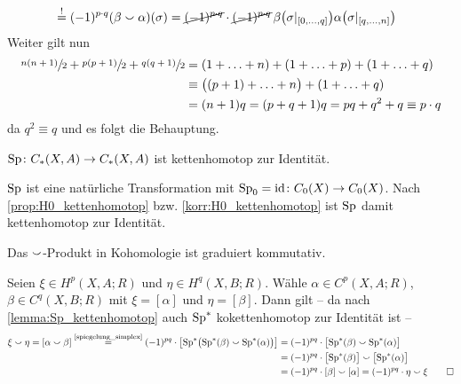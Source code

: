 \begin{beweis}
\begin{enumerate}[a)]
\begin{align}
			&\stackrel{!}{=} (-1)^{p \cdot q} \enbrace*{\beta \cupp \alpha}(\sigma) = \cancel{(-1)^{p \cdot q}} \cdot \cancel{(-1)^{p \cdot q}} \,\beta \enbrace*{\sigma|_{\benbrace{0, \ldots ,q}}} 
			\alpha \enbrace*{\sigma|_{\benbrace*{q, \ldots ,n}}}
		\end{align}
		Weiter gilt nun
		\begin{align}
			\sfrac{n(n+1)}{2} + \sfrac{p(p+1)}{2} + \sfrac{q(q+1)}{2} &= (1+ \ldots + n) + (1+ \ldots + p) + (1+ \ldots + q)\\ 
			&\equiv \enbrace[\big]{(p+1) + \ldots + n} + (1+ \ldots + q)\\
			&= (n+1) q = (p+q+1) q = pq + q^2 + q \equiv p \cdot q
		\end{align}
		da $q^2 \equiv q$ und es folgt die Behauptung.\qedhere
	\end{enumerate}
\end{beweis}

\begin{lemma}[{name=[Spiegelung ist kettenhomotop zur Identität]},label=lemma:Sp_kettenhomotop]
	$\Sp \colon C_*(X,A) \to C_*(X,A)$ ist kettenhomotop zur Identität. 
\end{lemma}
\begin{beweis}
	$\Sp$ ist eine natürliche Transformation mit $\Sp_0 =\id \colon C_0(X) \to C_0(X)$.
	Nach \autoref{prop:H0_kettenhomotop} bzw. \autoref{korr:H0_kettenhomotop} ist $\Sp$ damit kettenhomotop zur Identität.
\end{beweis}

\begin{satz}[{name=[Das $\cupp$-Produkt in Kohomologie ist graduiert kommutativ]}]
	Das $\cupp$-Produkt in Kohomologie ist graduiert kommutativ. 
\end{satz}
\begin{beweis}
	Seien $\xi \in H^p(X,A;R)$ und $\eta \in H^q(X,B;R)$. 
	Wähle $\alpha \in C^p(X,A;R)$, $\beta \in C^q(X,B;R)$ mit $\xi= [\alpha]$ und $\eta= [\beta]$. 
	Dann gilt -- da nach \autoref{lemma:Sp_kettenhomotop} auch $\Sp^*$ kokettenhomotop zur Identität ist --
	\begin{align}
		\xi \cupp \eta = \benbrace*{\alpha \cupp \beta} \StackText{\ref{spiegelung_simplex}}{=} (-1)^{pq} \cdot \benbrace*{\Sp^* \enbrace[\big]{\Sp^*(\beta) \cupp \Sp^*(\alpha)}} &= (-1)^{pq} \cdot 
		\benbrace[\big]{\Sp^*(\beta) \cupp \Sp^*(\alpha)} \\
		&= (-1)^{pq} \cdot \benbrace[\big]{\Sp^*(\beta)} \cupp \benbrace[\big]{\Sp^*(\alpha)}\\ 
		&= (-1)^{pq} \cdot [\beta] \cupp [\alpha] = (-1)^{pq} \cdot \eta \cupp \xi \qedhere
	\end{align}
\end{beweis}

